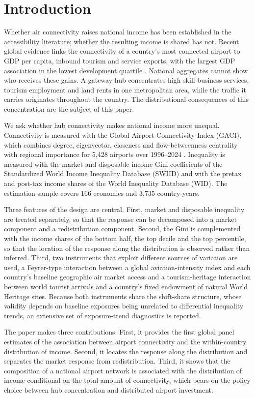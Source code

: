 \documentclass[12pt]{article}
\begin{document}
\section{Introduction}
\label{sec:intro}
Whether air connectivity raises national income has been established in the accessibility literature; whether the resulting income is shared has not. Recent global evidence links the connectivity of a country's most connected airport to GDP per capita, inbound tourism and service exports, with the largest GDP association in the lowest development quartile \citep{Yue_2026}. National aggregates cannot show who receives these gains. A gateway hub concentrates high-skill business services, tourism employment and land rents in one metropolitan area, while the traffic it carries originates throughout the country. The distributional consequences of this concentration are the subject of this paper.

We ask whether hub connectivity makes national income more unequal. Connectivity is measured with the Global Airport Connectivity Index (GACI), which combines degree, eigenvector, closeness and flow-betweenness centrality with regional importance for 5,428 airports over 1996--2024 \citep{Cheung_2020}. Inequality is measured with the market and disposable income Gini coefficients of the Standardized World Income Inequality Database (SWIID) and with the pretax and post-tax income shares of the World Inequality Database (WID). The estimation sample covers 166 economies and 3,735 country-years.

Three features of the design are central. First, market and disposable inequality are treated separately, so that the response can be decomposed into a market component and a redistribution component. Second, the Gini is complemented with the income shares of the bottom half, the top decile and the top percentile, so that the location of the response along the distribution is observed rather than inferred. Third, two instruments that exploit different sources of variation are used, a Feyrer-type interaction between a global aviation-intensity index and each country's baseline geographic air market access \citep{Feyrer_2019} and a tourism-heritage interaction between world tourist arrivals and a country's fixed endowment of natural World Heritage sites. Because both instruments share the shift-share structure, whose validity depends on baseline exposures being unrelated to differential inequality trends, an extensive set of exposure-trend diagnostics is reported.

The paper makes three contributions. First, it provides the first global panel estimates of the association between airport connectivity and the within-country distribution of income. Second, it locates the response along the distribution and separates the market response from redistribution. Third, it shows that the composition of a national airport network is associated with the distribution of income conditional on the total amount of connectivity, which bears on the policy choice between hub concentration and distributed airport investment.
\end{document}
